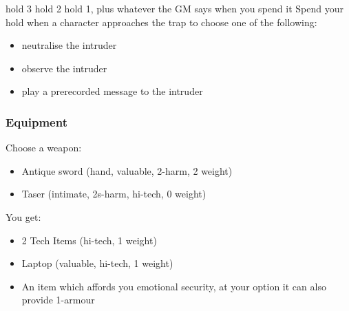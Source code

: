 {hold 3}
{hold 2}
{hold 1, plus whatever the GM says when you spend it}
Spend your hold when a character approaches the trap to choose one of the following:
\begin{itemize}
\item neutralise the intruder
\item observe the intruder
\item play a prerecorded message to the intruder
\end{itemize}


\subsubsection{Equipment}
Choose a weapon:
\begin{itemize}
\item Antique sword (hand, valuable, 2-harm, 2 weight)
\item Taser (intimate, 2s-harm, hi-tech, 0 weight)
\end{itemize}

You get:
\begin{itemize}
\item 2 Tech Items (hi-tech, 1 weight)
\item Laptop (valuable, hi-tech, 1 weight)
\item An item which affords you emotional security, at your option it can also provide 1-armour
\end{itemize}